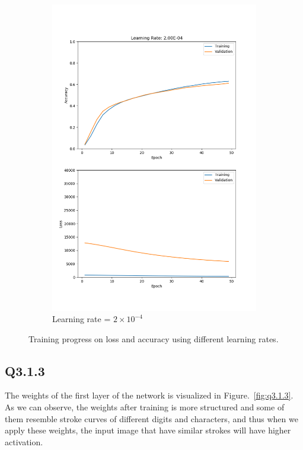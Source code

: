 \documentclass[11pt]{article}
\begin{document}
\begin{figure}[h!]
\begin{subfigure}{.325\textwidth}
      \includegraphics[width=.95\linewidth]{../results/q3_1_2_2E-04.png}
      \caption{Learning rate = $2\times10^{-4}$}
    \end{subfigure}\hfill
    \caption{Training progress on loss and accuracy using different learning rates. }
    \label{fig:q3.1.2}
\end{figure}

\newpage

\subsection*{Q3.1.3}

The weights of the first layer of the network is visualized in Figure.~\ref{fig:q3.1.3}. As we can observe, the weights after training is more structured and some of them resemble stroke curves of different digits and characters, and thus when we apply these weights, the input image that have similar strokes will have higher activation.
\end{document}
